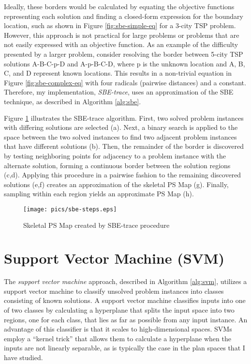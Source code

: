 Ideally, these borders would be calculated by equating the objective functions representing each solution and finding a closed-form expression for the boundary location, such as shown in Figure \ref{fig:sbe-simple-eq} for a 3-city TSP problem. However, this approach is not practical for large problems or problems that are not easily expressed with an objective function.  As an example of the difficulty presented by a larger problem, consider resolving the border between 5-city TSP solutions A-B-C-p-D and A-p-B-C-D, where p is the unknown location and A, B, C, and D represent known locations.  This results in a non-trivial equation in Figure \ref{fig:sbe-complex-eq} with four radicals (pairwise distances) and a constant.  Therefore, my implementation, \textit{SBE-trace}, uses an approximation of the SBE technique, as described in Algorithm \ref{alg:sbe}.    

  Figure \ref{fig:sbe-steps} illustrates the SBE-trace algorithm.  First, two solved problem instances with differing solutions are selected (a).  Next, a binary search is applied to the space between the two solved instances to find two adjacent problem instances that have different solutions (b).  Then, the remainder of the border is discovered by testing neighboring points for adjacency to a problem instance with the alternate solution, forming a continuous border between the solution regions (c,d).  Applying this procedure in a pairwise fashion to the remaining discovered solutions (e,f) creates an approximation of the skeletal PS Map (g).  Finally, sampling within each region yields an approximate PS Map (h).


\begin{figure}
\begin{center}
    \texttt{[image: pics/sbe-steps.eps]}
    \caption{Skeletal PS Map created by SBE-trace procedure}
    \label{fig:sbe-steps}
\end{center}
\end{figure}





\section{Support Vector Machine (SVM)}
The \textit{support vector machine} approach, described in Algorithm \ref{alg:svm}, utilizes a support vector machine \citep{vapnik95svm} to classify unsolved problem instances into classes consisting of known solutions.  A support vector machine classifies inputs into one of two classes by calculating a hyperplane that splits the input space into two regions, one for each class, that  lies as far as possible from any input instance.  An advantage of this classifier is that it scales to high-dimensional spaces.  SVMs employ a ``kernel trick'' that allows them to calculate a hyperplane when the inputs are not linearly separable, as is typically the case  in the plan spaces that I have studied.

